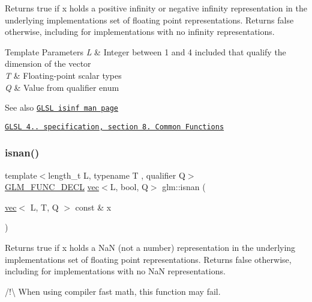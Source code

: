 Returns true if x holds a positive infinity or negative infinity representation in the underlying implementation\textquotesingle{}s set of floating point representations. Returns false otherwise, including for implementations with no infinity representations.


\begin{DoxyTemplParams}{Template Parameters}
{\em L} & Integer between 1 and 4 included that qualify the dimension of the vector \\
\hline
{\em T} & Floating-\/point scalar types \\
\hline
{\em Q} & Value from qualifier enum\\
\hline
\end{DoxyTemplParams}
\begin{DoxySeeAlso}{See also}
\href{http://www.opengl.org/sdk/docs/manglsl/xhtml/isinf.xml}{\tt G\+L\+SL isinf man page} 

\href{http://www.opengl.org/registry/doc/GLSLangSpec.4.20.8.pdf}{\tt G\+L\+SL 4.. specification, section 8. Common Functions} 
\end{DoxySeeAlso}
\mbox{\label{group__core__func__common_ga29ef934c00306490de837b4746b4e14d}} 
\subsubsection{\texorpdfstring{isnan()}{isnan()}}
{\footnotesize\ttfamily template$<$length\+\_\+t L, typename T , qualifier Q$>$ \\
\hyperlink{setup_8hpp_ab2d052de21a70539923e9bcbf6e83a51}{G\+L\+M\+\_\+\+F\+U\+N\+C\+\_\+\+D\+E\+CL} \hyperlink{structglm_1_1vec}{vec}$<$L, bool, Q$>$ glm\+::isnan (\begin{DoxyParamCaption}\item[{\hyperlink{structglm_1_1vec}{vec}$<$ L, T, Q $>$ const \&}]{x }\end{DoxyParamCaption})}

Returns true if x holds a NaN (not a number) representation in the underlying implementation\textquotesingle{}s set of floating point representations. Returns false otherwise, including for implementations with no NaN representations.

/!\textbackslash{} When using compiler fast math, this function may fail.



